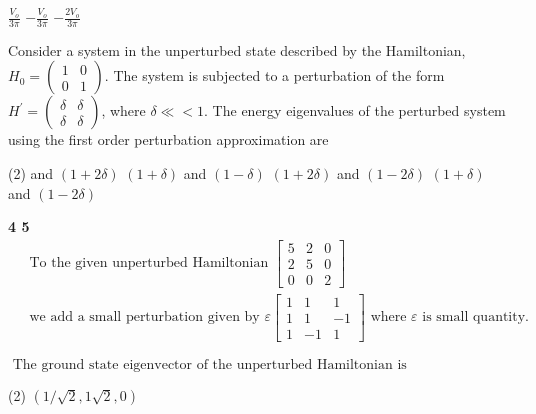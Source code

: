 \begin{enumerate}
\begin{tasks}
	\task[\textbf{B.}]$\frac{V_{o}}{3 \pi}$
	\task[\textbf{C.}]$-\frac{V_{o}}{3 \pi}$
	\task[\textbf{D.}]$-\frac{2 V_{o}}{3 \pi}$
\end{tasks}
\begin{minipage}{\textwidth}
	\item Consider a system in the unperturbed state described by the Hamiltonian, $H_{0}=\left(\begin{array}{ll}1 & 0 \\ 0 & 1\end{array}\right)$. The system is subjected to a perturbation of the form $H^{\prime}=\left(\begin{array}{ll}\delta & \delta \\ \delta & \delta\end{array}\right)$, where $\delta \ll<1$. The energy eigenvalues of the perturbed system using the first order perturbation approximation are
\end{minipage}
\begin{tasks}(2)
	 and $(1+2 \delta)$
	\task[\textbf{B.}]$(1+\delta)$ and $(1-\delta)$
	\task[\textbf{C.}]$(1+2 \delta)$ and $(1-2 \delta)$
	\task[\textbf{D.}]$(1+\delta)$ and $(1-2 \delta)$
\end{tasks}
\textbf{ 4  5}\\
$\begin{aligned}
&\text { To the given unperturbed Hamiltonian }\left[\begin{array}{ccc}
5 & 2 & 0 \\
2 & 5 & 0 \\
0 & 0 & 2
\end{array}\right] \\
&\text { we add a small perturbation given by } \varepsilon\left[\begin{array}{ccc}
1 & 1 & 1 \\
1 & 1 & -1 \\
1 & -1 & 1
\end{array}\right] \text { where } \varepsilon \text { is small quantity. }
\end{aligned}$\\
\begin{minipage}{\textwidth}
	\item $\text { The ground state eigenvector of the unperturbed Hamiltonian is }$
\end{minipage}
\begin{tasks}(2)
	\task[\textbf{A.}] $(1 / \sqrt{2}, 1 \sqrt{2}, 0)$

\end{tasks}
\end{enumerate}
